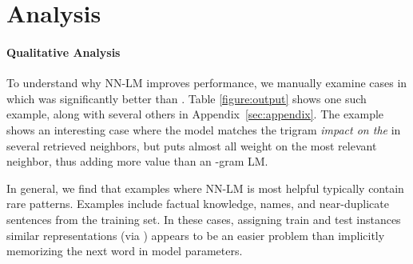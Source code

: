 \documentclass{article} \usepackage{iclr2020_conference,times}
\begin{document}
 

\section{Analysis}

\paragraph{Qualitative Analysis}
To understand why NN-LM improves performance, we manually examine cases in which  was significantly better than .
Table \ref{figure:output} shows one such example, along with several others in Appendix~\ref{sec:appendix}. The example shows an interesting case where the model matches the trigram \emph{impact on the} in several retrieved neighbors, but puts almost all weight on the most relevant neighbor, thus adding more value than an -gram LM.

In general, we find that examples where NN-LM is most helpful typically contain rare patterns.
Examples include factual knowledge, names, and near-duplicate sentences from the training set.
In these cases, assigning train and test instances similar representations (via ) appears to be an easier problem than implicitly memorizing the next word in model parameters.
\end{document}
